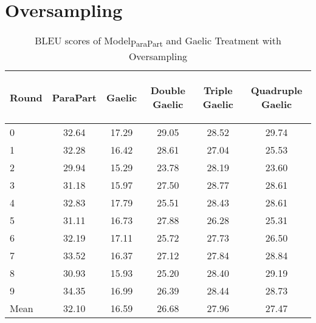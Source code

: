 \section{Oversampling}
\begin{table}[ht]
\centering
\begin{tabular}{lccccc}
  \hline
\begin{sideways} Round \end{sideways} & \begin{sideways} ParaPart \end{sideways} & \begin{sideways} Gaelic \end{sideways} & \begin{sideways} Double Gaelic  \end{sideways} & \begin{sideways} Triple Gaelic \end{sideways} & \begin{sideways} Quadruple Gaelic \end{sideways} \\ 
  \hline
0 & 32.64 & 17.29 & 29.05 & 28.52 & 29.74 \\ 
  1 & 32.28 & 16.42 & 28.61 & 27.04 & 25.53 \\ 
  2 & 29.94 & 15.29 & 23.78 & 28.19 & 23.60 \\ 
  3 & 31.18 & 15.97 & 27.50 & 28.77 & 28.61 \\ 
  4 & 32.83 & 17.79 & 25.51 & 28.43 & 28.61 \\ 
  5 & 31.11 & 16.73 & 27.88 & 26.28 & 25.31 \\ 
  6 & 32.19 & 17.11 & 25.72 & 27.73 & 26.50 \\ 
  7 & 33.52 & 16.37 & 27.12 & 27.84 & 28.84 \\ 
  8 & 30.93 & 15.93 & 25.20 & 28.40 & 29.19 \\ 
  9 & 34.35 & 16.99 & 26.39 & 28.44 & 28.73 \\ 
   \hline
Mean & 32.10 & 16.59 & 26.68 & 27.96 & 27.47 \\ 
   \hline
\end{tabular}
\caption{BLEU scores of Model\textsubscript{ParaPart} and Gaelic Treatment with Oversampling} 
\label{Table:over}
\end{table}
